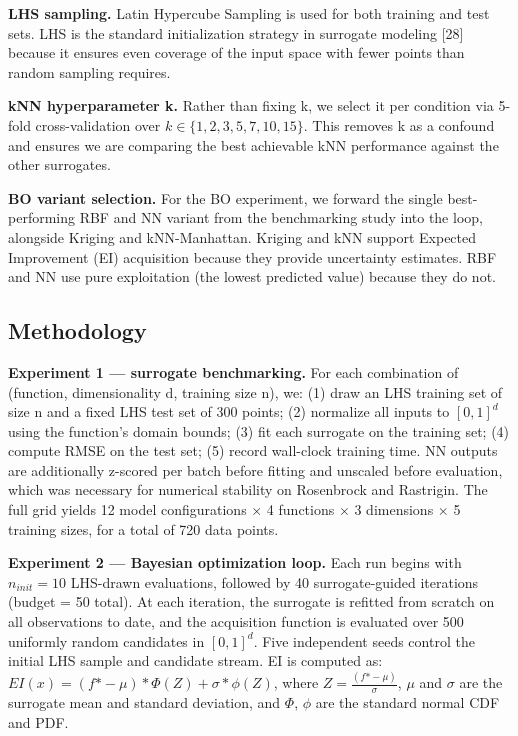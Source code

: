 \documentclass[sigconf,nonacm]{acmart}
\begin{document}
\textbf{LHS sampling.}  Latin Hypercube Sampling is used for both training and test sets. LHS is the standard initialization strategy in surrogate modeling [28] because it ensures even coverage of the input space with fewer points than random sampling requires.

\textbf{kNN hyperparameter k.}  Rather than fixing k, we select it per condition via 5-fold cross-validation over $k \in \{1, 2, 3, 5, 7, 10, 15\}$. This removes k as a confound and ensures we are comparing the best achievable kNN performance against the other surrogates.

\textbf{BO variant selection.}  For the BO experiment, we forward the single best-performing RBF and NN variant from the benchmarking study into the loop, alongside Kriging and kNN-Manhattan. Kriging and kNN support Expected Improvement (EI) acquisition because they provide uncertainty estimates. RBF and NN use pure exploitation (the lowest predicted value) because they do not.

\subsection{Methodology}

\textbf{Experiment 1 — surrogate benchmarking.}  For each combination of (function, dimensionality d, training size n), we: (1) draw an LHS training set of size n and a fixed LHS test set of 300 points; (2) normalize all inputs to $[0, 1]^d$ using the function's domain bounds; (3) fit each surrogate on the training set; (4) compute RMSE on the test set; (5) record wall-clock training time. NN outputs are additionally z-scored per batch before fitting and unscaled before evaluation, which was necessary for numerical stability on Rosenbrock and Rastrigin. The full grid yields 12 model configurations × 4 functions × 3 dimensions × 5 training sizes, for a total of 720 data points.

\textbf{Experiment 2 — Bayesian optimization loop.}  Each run begins with $n_{init} = 10$ LHS-drawn evaluations, followed by 40 surrogate-guided iterations (budget = 50 total). At each iteration, the surrogate is refitted from scratch on all observations to date, and the acquisition function is evaluated over 500 uniformly random candidates in $[0, 1]^d$. Five independent seeds control the initial LHS sample and candidate stream. EI is computed as: $EI(x) = (f\text{*} - \mu)*\Phi(Z) + \sigma*\phi(Z)$, where $Z = \frac{(f\text{*} - \mu)}{\sigma}$, $\mu$ and $\sigma$ are the surrogate mean and standard deviation, and $\Phi$, $\phi$ are the standard normal CDF and PDF.
\end{document}
